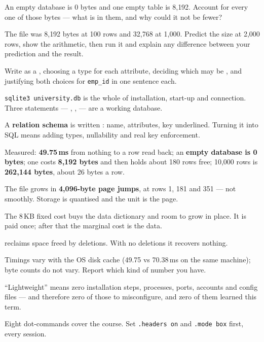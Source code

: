 \begin{checkpoint}
\begin{tightnum}
  \item An empty database is 0 bytes and one empty table is 8{,}192. Account
        for every one of those bytes --- what is in them, and why could it not
        be fewer?
  \item The file was 8{,}192 bytes at 100 rows and 32{,}768 at 1{,}000. Predict
        the size at 2{,}000 rows, show the arithmetic, then run it and explain
        any difference between your prediction and the result.
  \item Write  as a , choosing a type for each
        attribute, deciding which may be , and justifying both
        choices for \texttt{emp\_id} in one sentence each.
\end{tightnum}
\end{checkpoint}

\begin{chaptersummary}
\begin{tight}
  \item \texttt{sqlite3 university.db} is the whole of installation,
        start-up and connection. Three statements --- ,
        ,  --- are a working database.
  \item A \textbf{relation schema} is written : name, attributes, key underlined. Turning
        it into SQL means adding types, nullability and real key enforcement.
  \item Measured: \textbf{49.75\,ms} from nothing to a row read back; an
        \textbf{empty database is 0 bytes}; one  costs
        \textbf{8{,}192 bytes} and then holds about 180 rows free; 10{,}000
        rows is \textbf{262{,}144 bytes}, about 26 bytes a row.
  \item The file grows in \textbf{4{,}096-byte page jumps}, at rows 1, 181 and
        351 --- not smoothly. Storage is quantised and the unit is the page.
  \item The 8\,KB fixed cost buys the data dictionary and room to grow in
        place. It is paid once; after that the marginal cost is the data.
  \item {} reclaims space freed by deletions. With no deletions it
        recovers nothing.
  \item Timings vary with the OS disk cache (49.75 vs 70.38\,ms on the same
        machine); byte counts do not vary. Report which kind of number you
        have.
  \item ``Lightweight'' means zero installation steps, processes, ports,
        accounts and config files --- and therefore zero of those to
        misconfigure, and zero of them learned this term.
  \item Eight dot-commands cover the course. Set \texttt{.headers on} and
        \texttt{.mode box} first, every session.
\end{tight}
\end{chaptersummary}


